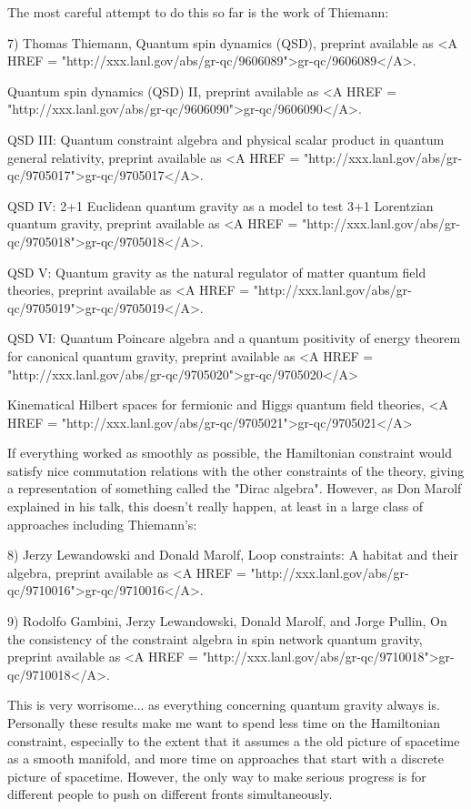 The most careful attempt to do this so far is the work of Thiemann:

7) Thomas Thiemann, Quantum spin dynamics (QSD), preprint 
available as <A HREF = "http://xxx.lanl.gov/abs/gr-qc/9606089">gr-qc/9606089</A>.

Quantum spin dynamics (QSD) II, preprint available as
<A HREF = "http://xxx.lanl.gov/abs/gr-qc/9606090">gr-qc/9606090</A>.

QSD III: Quantum constraint algebra and physical scalar
product in quantum general relativity, preprint available as
<A HREF = "http://xxx.lanl.gov/abs/gr-qc/9705017">gr-qc/9705017</A>.

QSD IV: 2+1 Euclidean quantum gravity as a model to test
3+1 Lorentzian quantum gravity, preprint available as <A HREF = "http://xxx.lanl.gov/abs/gr-qc/9705018">gr-qc/9705018</A>.

QSD V: Quantum gravity as the natural regulator of matter
quantum field theories, preprint available as <A HREF = "http://xxx.lanl.gov/abs/gr-qc/9705019">gr-qc/9705019</A>.

QSD VI: Quantum Poincare algebra and a quantum positivity of energy
theorem for canonical quantum gravity, preprint available as
<A HREF = "http://xxx.lanl.gov/abs/gr-qc/9705020">gr-qc/9705020</A>

Kinematical Hilbert spaces for fermionic and Higgs quantum
field theories, <A HREF = "http://xxx.lanl.gov/abs/gr-qc/9705021">gr-qc/9705021</A>

If everything worked as smoothly as possible, the Hamiltonian constraint
would satisfy nice commutation relations with the other constraints of
the theory, giving a representation of something called the "Dirac
algebra".  However, as Don Marolf explained in his talk, this doesn't
really happen, at least in a large class of approaches including
Thiemann's:

8) Jerzy Lewandowski and Donald Marolf, Loop constraints: A habitat and
their algebra, preprint available as <A HREF = "http://xxx.lanl.gov/abs/gr-qc/9710016">gr-qc/9710016</A>.  

9) Rodolfo Gambini, Jerzy Lewandowski, Donald Marolf, and Jorge Pullin, 
On the consistency of the constraint algebra in spin network quantum
gravity, preprint available as <A HREF = "http://xxx.lanl.gov/abs/gr-qc/9710018">gr-qc/9710018</A>.

This is very worrisome... as everything concerning quantum gravity
always is.  Personally these results make me want to spend less time on
the Hamiltonian constraint, especially to the extent that it assumes a
the old picture of spacetime as a smooth manifold, and more time on
approaches that start with a discrete picture of spacetime.  However,
the only way to make serious progress is for different people to push on
different fronts simultaneously.  

